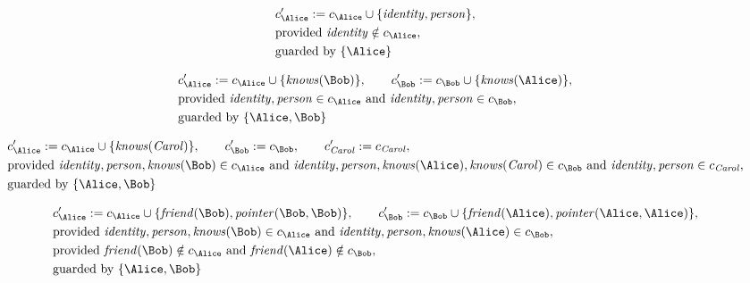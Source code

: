 \begin{align*}
&
c'_
{
\Alice
}
 := 
c_
{
\Alice
}
 \cup 
\{
\mathit{\detokenize{
identity
}}
,
\mathit{\detokenize{
person
}}
\}
,\\
&
\text{provided } 
\mathit{\detokenize{
identity
}}
 \notin c_
{
\Alice
}
,\\
&
\text{guarded by } \{
\Alice
\}
\end{align*}

\begin{align*}
&
c'_
{
\Alice
}
 := 
c_
{
\Alice
}
 \cup 
\{
\mathit{\detokenize{
knows
}}
(
\Bob
)
\}
, \qquad 
c'_
{
\Bob
}
 := 
c_
{
\Bob
}
 \cup 
\{
\mathit{\detokenize{
knows
}}
(
\Alice
)
\}
,\\
&
\text{provided } 
\mathit{\detokenize{
identity
}}
,
\mathit{\detokenize{
person
}}
 \in c_
{
\Alice
}
 \text{ and } 
\mathit{\detokenize{
identity
}}
,
\mathit{\detokenize{
person
}}
 \in c_
{
\Bob
}
,\\
&
\text{guarded by } \{
\Alice
,
\Bob
\}
\end{align*}

\begin{align*}
&
c'_
{
\Alice
}
 := 
c_
{
\Alice
}
 \cup 
\{
\mathit{\detokenize{
knows
}}
(
\mathit{Carol}
)
\}
, \qquad 
c'_
{
\Bob
}
 := 
c_
{
\Bob
}
, \qquad 
c'_
{
\mathit{Carol}
}
 := 
c_
{
\mathit{Carol}
}
,\\
&
\text{provided } 
\mathit{\detokenize{
identity
}}
,
\mathit{\detokenize{
person
}}
,
\mathit{\detokenize{
knows
}}
(
\Bob
)
 \in c_
{
\Alice
}
 \text{ and } 
\mathit{\detokenize{
identity
}}
,
\mathit{\detokenize{
person
}}
,
\mathit{\detokenize{
knows
}}
(
\Alice
)
,
\mathit{\detokenize{
knows
}}
(
\mathit{Carol}
)
 \in c_
{
\Bob
}
 \text{ and } 
\mathit{\detokenize{
identity
}}
,
\mathit{\detokenize{
person
}}
 \in c_
{
\mathit{Carol}
}
,\\
&
\text{guarded by } \{
\Alice
,
\Bob
\}
\end{align*}

\begin{align*}
&
c'_
{
\Alice
}
 := 
c_
{
\Alice
}
 \cup 
\{
\mathit{\detokenize{
friend
}}
(
\Bob
)
,
\mathit{\detokenize{
pointer
}}
(
\Bob
,
\Bob
)
\}
, \qquad 
c'_
{
\Bob
}
 := 
c_
{
\Bob
}
 \cup 
\{
\mathit{\detokenize{
friend
}}
(
\Alice
)
,
\mathit{\detokenize{
pointer
}}
(
\Alice
,
\Alice
)
\}
,\\
&
\text{provided } 
\mathit{\detokenize{
identity
}}
,
\mathit{\detokenize{
person
}}
,
\mathit{\detokenize{
knows
}}
(
\Bob
)
 \in c_
{
\Alice
}
 \text{ and } 
\mathit{\detokenize{
identity
}}
,
\mathit{\detokenize{
person
}}
,
\mathit{\detokenize{
knows
}}
(
\Alice
)
 \in c_
{
\Bob
}
,\\
&
\text{provided } 
\mathit{\detokenize{
friend
}}
(
\Bob
)
 \notin c_
{
\Alice
}
 \text{ and } 
\mathit{\detokenize{
friend
}}
(
\Alice
)
 \notin c_
{
\Bob
}
,\\
&
\text{guarded by } \{
\Alice
,
\Bob
\}
\end{align*}

